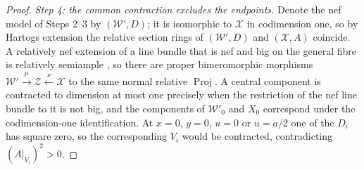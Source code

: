 \documentclass[11pt]{article}
\newcommand{\calX}{\mathcal X}
\newcommand{\calW}{\mathcal W}
\newcommand{\calZ}{\mathcal Z}
\theoremstyle{definition}
\theoremstyle{remark}
\begin{document}
\begin{proof}
\emph{Step 4: the common contraction excludes the endpoints.}
Denote the nef model of Steps 2--3 by \((\calW',D)\); it is isomorphic
to \(\calX\) in codimension one, so by Hartogs extension the relative
section rings of \((\calW',D)\) and \((\calX,A)\) coincide. A
relatively nef extension of a line bundle that is nef and big on the
general fibre is relatively semiample \cite[\S2A]{ABE}, so there are
proper bimeromorphic morphisms
\(\calW'\xrightarrow{\,\mu\,}\calZ\xleftarrow{\,\nu\,}\calX\) to the same
normal relative \(\operatorname{Proj}\). A central component is
contracted to dimension at most one precisely when the restriction of
the nef line bundle to it is not big, and the components of
\(\calW'_0\) and \(X_0\) correspond under the codimension-one
identification. At \(x=0\), \(y=0\), \(u=0\) or \(u=a/2\) one of the
\(D_i\) has square zero, so the corresponding \(V_i\) would be
contracted, contradicting \((A|_{V_i})^2>0\).



\end{proof}
\end{document}
